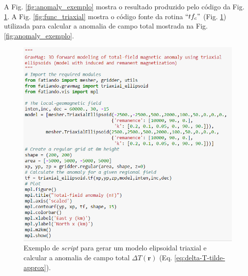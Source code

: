 A Fig. \ref{fig:anomaly_exemplo} mostra o resultado produzido pelo código da Fig. \ref{fig:Cookbook_Triaxial}. A Fig. \ref{fig:func_triaxial} mostra o código fonte da rotina \textit{$``tf_c"$} (Fig. \ref{fig:Cookbook_Triaxial}) utilizada para calcular a anomalia de campo total mostrada na Fig. \ref{fig:anomaly_exemplo}.

\begin{figure}[hbt!]
	\centering \includegraphics[width=16 cm,height=16 cm]{figures/Cookbook_Triaxial}
	\caption[Exemplo de \textit{script} para gerar um modelo elipsoidal triaxial e calcular a anomalia de campo total $\Delta T (\mathbf{r})$ (Eq. \ref{eq:delta-T-tilde-approx}).]{Exemplo de \textit{script} para gerar um modelo elipsoidal triaxial e calcular a anomalia de campo total $\Delta T (\mathbf{r})$ (Eq. \ref{eq:delta-T-tilde-approx}).}
	\label{fig:Cookbook_Triaxial}
\end{figure}

